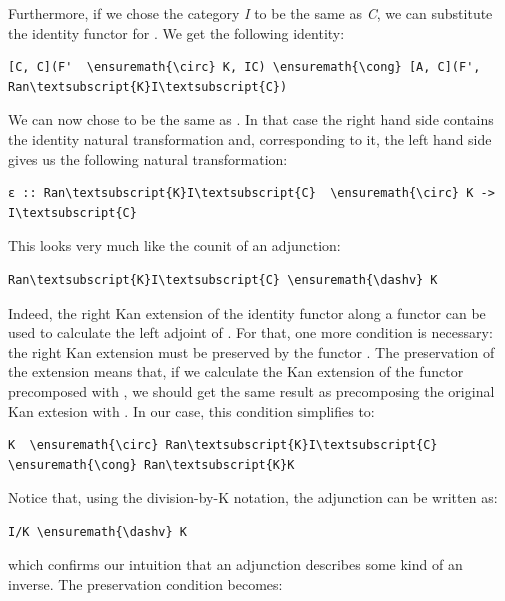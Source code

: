 \noindent
Furthermore, if we chose the category \emph{I} to be the same as
\emph{C}, we can substitute the identity functor  for
. We get the following identity:

\begin{Verbatim}[commandchars=\\\{\}]
[C, C](F'  \ensuremath{\circ} K, IC) \ensuremath{\cong} [A, C](F', Ran\textsubscript{K}I\textsubscript{C})
\end{Verbatim}
We can now chose  to be the same as . In
that case the right hand side contains the identity natural
transformation and, corresponding to it, the left hand side gives us the
following natural transformation:

\begin{Verbatim}[commandchars=\\\{\}]
ε :: Ran\textsubscript{K}I\textsubscript{C}  \ensuremath{\circ} K -> I\textsubscript{C}
\end{Verbatim}
This looks very much like the counit of an adjunction:

\begin{Verbatim}[commandchars=\\\{\}]
Ran\textsubscript{K}I\textsubscript{C} \ensuremath{\dashv} K
\end{Verbatim}
Indeed, the right Kan extension of the identity functor along a functor
 can be used to calculate the left adjoint of . For
that, one more condition is necessary: the right Kan extension must be
preserved by the functor . The preservation of the extension
means that, if we calculate the Kan extension of the functor precomposed
with , we should get the same result as precomposing the
original Kan extesion with . In our case, this condition
simplifies to:

\begin{Verbatim}[commandchars=\\\{\}]
K  \ensuremath{\circ} Ran\textsubscript{K}I\textsubscript{C} \ensuremath{\cong} Ran\textsubscript{K}K
\end{Verbatim}
Notice that, using the division-by-K notation, the adjunction can be
written as:

\begin{Verbatim}[commandchars=\\\{\}]
I/K \ensuremath{\dashv} K
\end{Verbatim}
which confirms our intuition that an adjunction describes some kind of
an inverse. The preservation condition becomes:

